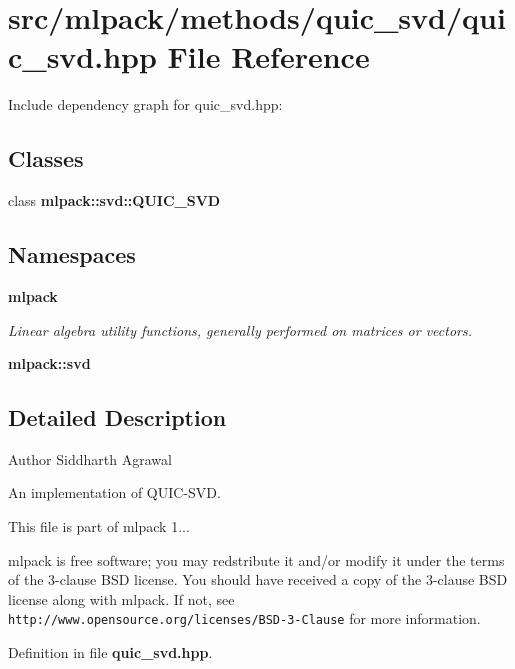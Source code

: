 \section{src/mlpack/methods/quic\-\_\-svd/quic\-\_\-svd.hpp File Reference}
\label{quic__svd_8hpp}
Include dependency graph for quic\-\_\-svd.\-hpp\-:
\subsection*{Classes}
\begin{DoxyCompactItemize}
\item 
class {\bf mlpack\-::svd\-::\-Q\-U\-I\-C\-\_\-\-S\-V\-D}
\end{DoxyCompactItemize}
\subsection*{Namespaces}
\begin{DoxyCompactItemize}
\item 
{\bf mlpack}
\begin{DoxyCompactList}\small\item\em Linear algebra utility functions, generally performed on matrices or vectors. \end{DoxyCompactList}\item 
{\bf mlpack\-::svd}
\end{DoxyCompactItemize}


\subsection{Detailed Description}
\begin{DoxyAuthor}{Author}
Siddharth Agrawal
\end{DoxyAuthor}
An implementation of Q\-U\-I\-C-\/\-S\-V\-D.

This file is part of mlpack 1...

mlpack is free software; you may redstribute it and/or modify it under the terms of the 3-\/clause B\-S\-D license. You should have received a copy of the 3-\/clause B\-S\-D license along with mlpack. If not, see {\tt http\-://www.\-opensource.\-org/licenses/\-B\-S\-D-\/3-\/\-Clause} for more information. 

Definition in file {\bf quic\-\_\-svd.\-hpp}.

